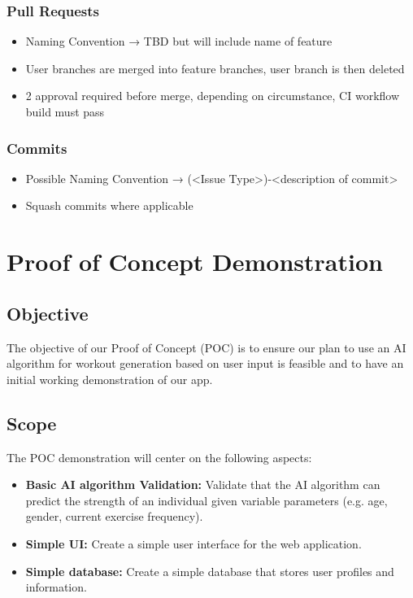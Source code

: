 \documentclass{article}
\begin{document}
	\subsubsection{Pull Requests}
	\begin{itemize}
		\item Naming Convention → TBD but will include name of feature
		\item User branches are merged into feature branches, user branch is then deleted
		\item 2 approval required before merge, depending on circumstance, CI workflow build must pass
	\end{itemize}

	\subsubsection{Commits}
	\begin{itemize}
		\item Possible Naming Convention → (\textless Issue Type\textgreater)-\textless description of commit\textgreater
		\item Squash commits where applicable
	\end{itemize}

	\section{Proof of Concept Demonstration}

	\subsection{Objective}
	The objective of our Proof of Concept (POC) is to ensure our plan to use an AI algorithm for workout generation based on user input is feasible and to have an initial working demonstration of our app.

	\subsection{Scope}
	The POC demonstration will center on the following aspects:
	\begin{itemize}
		\item \textbf{Basic AI algorithm Validation:} Validate that the AI algorithm can predict the strength of an individual given variable parameters (e.g. age, gender, current exercise frequency).
		\item \textbf{Simple UI:} Create a simple user interface for the web application.
		\item \textbf{Simple database:} Create a simple database that stores user profiles and information.
	\end{itemize}
\end{document}

